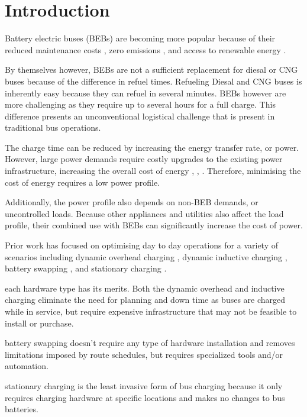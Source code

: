 \section{Introduction}
\par  Battery electric buses (BEBs) are becoming more popular because of their reduced maintenance costs \cite{poornesh_comparative_2020}, zero emissions \cite{kato_comparative_2013}, and access to renewable energy \cite{cheng_smart_2020}.
\par  By themselves however, BEBs are not a sufficient replacement for diesal or CNG buses because of the difference in refuel times. Refueling Diesal and CNG buses is inherently easy because they can refuel in several minutes. BEBs however are more challenging as they require up to several hours for a full charge. This difference presents an unconventional logistical challenge that is present in traditional bus operations. 
\par The charge time can be reduced by increasing the energy transfer rate, or power.  However, large power demands require costly upgrades to the existing power infrastructure, increasing the overall cost of energy \cite{stahleder_impact_2019}, \cite{deb_impact_2017}, \cite{boonraksa_impact_2019}. Therefore, minimising the cost of energy requires a low power profile.
\par Additionally, the power profile also depends on non-BEB demands, or uncontrolled loads. Because other appliances and utilities also affect the load profile, their combined use with BEBs can significantly increase the cost of power. 
\par Prior work has focused on optimising day to day operations for a variety of scenarios including dynamic overhead charging \cite{csonka_optimization_2021}, dynamic inductive charging \cite{jeong_automatic_2018} \cite{balde_electric_2019}, battery swapping \cite{jain_battery_2020} \cite{xian_zhang_optimal_2016}, and stationary charging \cite{whitaker_network_nodate}.
\par each hardware type has its merits. Both the dynamic overhead and inductive charging eliminate the need for planning and down time as buses are charged while in service, but require expensive infrastructure that may not be feasible to install or purchase.
\par battery swapping doesn't require any type of hardware installation and removes limitations imposed by route schedules, but requires specialized tools and/or automation.
\par stationary charging is the least invasive form of bus charging because it only requires charging hardware at specific locations and makes no changes to bus batteries. 
